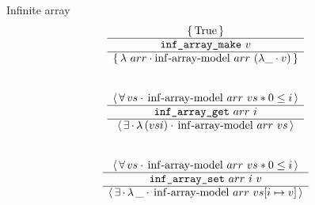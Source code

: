 \begin{frame}{Infinite array}
\[
	\begin{array}{c}
			\triplePretty{
				\iTrue
			}{
				\texttt{inf\_array\_make}\ v
			}{
				\lambda\ arr \cdot
				\mathrm{inf \mathhyphen array \mathhyphen model}\ arr\ (\lambda \_ \cdot v)
			}
		\\\\\\
			\atriplePretty{
				vs
			}{
				\mathrm{inf \mathhyphen array \mathhyphen model}\ arr\ vs \iSep
				0 \leq i
			}{
				\texttt{inf\_array\_get}\ arr\ i
			}{
			}{
				(vs i)
			}{
				\mathrm{inf \mathhyphen array \mathhyphen model}\ arr\ vs
			}
		\\\\\\
			\atriplePretty{
				vs
			}{
				\mathrm{inf \mathhyphen array \mathhyphen model}\ arr\ vs \iSep
				0 \leq i
			}{
				\texttt{inf\_array\_set}\ arr\ i\ v
			}{
			}{
				\_
			}{
				\mathrm{inf \mathhyphen array \mathhyphen model}\ arr\ vs [i \mapsto v]
			}
	\end{array}
\]
\end{frame}